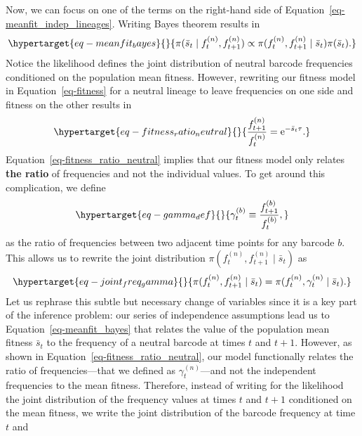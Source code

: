 \documentclass[
]{scrartcl}
\begin{document}
\begin{refsegment}
Now, we can focus on one of the terms on the right-hand side of
Equation~\ref{eq-meanfit_indep_lineages}. Writing Bayes theorem results
in \begin{equation}\protect\hypertarget{eq-meanfit_bayes}{}{
\pi(\bar{s}_t \mid f_t^{(n)}, f_{t+1}^{(n)}) \propto
\pi(f_t^{(n)}, f_{t+1}^{(n)} \mid \bar{s}_t) \pi(\bar{s}_t).
}\label{eq-meanfit_bayes}\end{equation} Notice the likelihood defines
the joint distribution of neutral barcode frequencies conditioned on the
population mean fitness. However, rewriting our fitness model in
Equation~\ref{eq-fitness} for a neutral lineage to leave frequencies on
one side and fitness on the other results in
\begin{equation}\protect\hypertarget{eq-fitness_ratio_neutral}{}{
\frac{f_{t+1}^{(n)}}{f_t^{(n)}} = \mathrm{e}^{- \bar{s}_t\tau}.
}\label{eq-fitness_ratio_neutral}\end{equation}
Equation~\ref{eq-fitness_ratio_neutral} implies that our fitness model
only relates \textbf{the ratio} of frequencies and not the individual
values. To get around this complication, we define
\begin{equation}\protect\hypertarget{eq-gamma_def}{}{
\gamma_t^{(b)} \equiv \frac{f_{t+1}^{(b)}}{f_t^{(b)}},
}\label{eq-gamma_def}\end{equation} as the ratio of frequencies between
two adjacent time points for any barcode \(b\). This allows us to
rewrite the joint distribution
\(\pi(f_t^{(n)}, f_{t+1}^{(n)} \mid \bar{s}_t)\) as
\begin{equation}\protect\hypertarget{eq-joint_freq_gamma}{}{
\pi(f_t^{(n)}, f_{t+1}^{(n)} \mid \bar{s}_t) =
\pi(f_t^{(n)}, \gamma_{t}^{(n)} \mid \bar{s}_t).
}\label{eq-joint_freq_gamma}\end{equation} Let us rephrase this subtle
but necessary change of variables since it is a key part of the
inference problem: our series of independence assumptions lead us to
Equation~\ref{eq-meanfit_bayes} that relates the value of the population
mean fitness \(\bar{s}_t\) to the frequency of a neutral barcode at
times \(t\) and \(t+1\). However, as shown in
Equation~\ref{eq-fitness_ratio_neutral}, our model functionally relates
the ratio of frequencies---that we defined as \(\gamma_t^{(n)}\)---and
not the independent frequencies to the mean fitness. Therefore, instead
of writing for the likelihood the joint distribution of the frequency
values at times \(t\) and \(t+1\) conditioned on the mean fitness, we
write the joint distribution of the barcode frequency at time \(t\) and

\end{refsegment}
\end{document}
